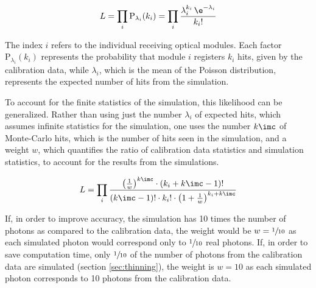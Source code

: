 \begin{equation}
  L = \prod_{i} \text{P}_{\lambda_i}(k_i) = \prod_{i} \frac{\lambda_i^{k_i}\,\e^{-\lambda_i}}{k_i !}
\end{equation}

The index $i$ refers to the individual receiving optical modules. Each factor $\text{P}_{\lambda_i}(k_i)$ represents the probability that module $i$ registers $k_i$ hits, given by the calibration data, while $\lambda_i$, which is the mean of the Poisson distribution, represents the expected number of hits from the simulation.

%
%

To account for the finite statistics of the simulation, this likelihood can be generalized. Rather than using just the number $\lambda_i$ of expected hits, which assumes infinite statistics for the simulation, one uses the number $k\imc$ of Monte-Carlo hits, which is the number of hits seen in the simulation, and a weight $w$, which quantifies the ratio of calibration data statistics and simulation statistics, to account for the results from the simulations. \cite[equation 21]{Gluesenkamp2018}

\begin{equation}
  L = \prod_{i} \frac%
    {\left(\frac{1}{w}\right)^{k\imc} \cdot \left(k_i + k\imc - 1\right)!}%
    {(k\imc - 1)! \cdot k_i! \cdot \left( 1 + \frac{1}{w} \right)^{k_i + k\imc}}
\end{equation}

If, in order to improve accuracy, the simulation has 10 times the number of photons as compared to the calibration data, the weight would be $w=\sfrac{1}{10}$ as each simulated photon would correspond only to $\sfrac{1}{10}$ real photons. If, in order to save computation time, only $\sfrac{1}{10}$ of the number of photons from the calibration data are simulated (section \ref{sec:thinning}), the weight is $w=10$ as each simulated photon corresponds to 10 photons from the calibration data.


